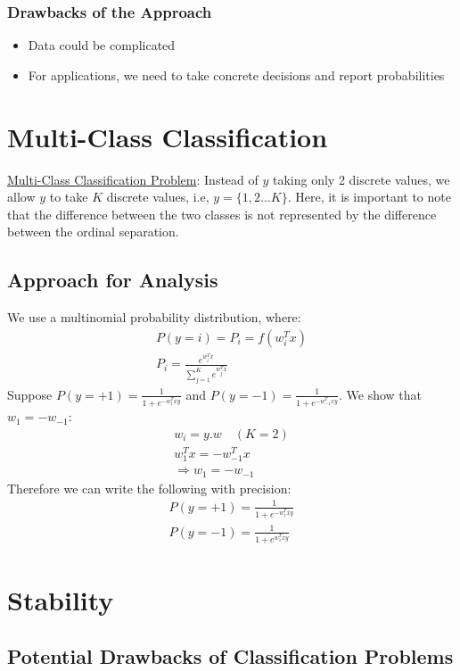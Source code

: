 \documentclass[11pt, twosides]{article}
\begin{document}
\subsubsection{Drawbacks of the Approach}
\begin{itemize}
    \item Data could be complicated
    \item For applications, we need to take concrete decisions and report probabilities
\end{itemize}

\section{Multi-Class Classification}
\underline{Multi-Class Classification Problem}: Instead of $y$ taking only 2 discrete values, we allow $y$ to take $K$ discrete values, i.e, $y = \{1,2...K\}$.
Here, it is important to note that the difference between the two classes is not represented by the difference between the ordinal separation.
\subsection{Approach for Analysis}
We use a multinomial probability distribution, where:
\begin{align}
    P(y=i) = P_i = f(w_i^Tx) \\
    P_i = \frac{e^{w_i^Tx}}{\sum_{j=1}^Ke^{w_j^Tx}}
\end{align}
Suppose $P(y=+1) = \frac{1}{1+e^{-w_1^Txy}}$ and $P(y=-1) = \frac{1}{1+e^{-w_{-1}^Txy}}$. We show that $w_1 = -w_{-1}$:
\begin{align}
    w_i = y.w \quad (K=2)\\
    w_1^Tx = -w_{-1}^Tx \\
    \Rightarrow w_1 = -w_{-1}
\end{align}
Therefore we can write the following with precision:
\begin{align}
    P(y = +1)=\frac{1}{1+e^{-w_1^Txy}} \\
    P(y = -1) = \frac{1}{1+e^{w_1^Txy}}
\end{align}
\newpage
\section{Stability}
\subsection{Potential Drawbacks of Classification Problems}
\end{document}
